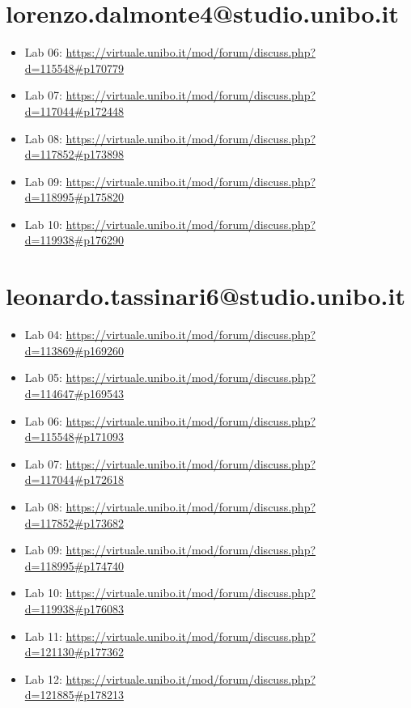 \documentclass[a4paper,12pt]{report}
\begin{document}
\section*{lorenzo.dalmonte4@studio.unibo.it}

\begin{itemize}
	\item Lab 06: \url{https://virtuale.unibo.it/mod/forum/discuss.php?d=115548#p170779}
	\item Lab 07: \url{https://virtuale.unibo.it/mod/forum/discuss.php?d=117044#p172448}
	\item Lab 08: \url{https://virtuale.unibo.it/mod/forum/discuss.php?d=117852#p173898}
	\item Lab 09: \url{https://virtuale.unibo.it/mod/forum/discuss.php?d=118995#p175820}
	\item Lab 10: \url{https://virtuale.unibo.it/mod/forum/discuss.php?d=119938#p176290}
\end{itemize}
\section*{leonardo.tassinari6@studio.unibo.it}

\begin{itemize}
	\item Lab 04: \url{https://virtuale.unibo.it/mod/forum/discuss.php?d=113869#p169260}
	\item Lab 05: \url{https://virtuale.unibo.it/mod/forum/discuss.php?d=114647#p169543}
	\item Lab 06: \url{https://virtuale.unibo.it/mod/forum/discuss.php?d=115548#p171093}
	\item Lab 07: \url{https://virtuale.unibo.it/mod/forum/discuss.php?d=117044#p172618}
	\item Lab 08: \url{https://virtuale.unibo.it/mod/forum/discuss.php?d=117852#p173682}
	\item Lab 09: \url{https://virtuale.unibo.it/mod/forum/discuss.php?d=118995#p174740}
	\item Lab 10: \url{https://virtuale.unibo.it/mod/forum/discuss.php?d=119938#p176083}
	\item Lab 11: \url{https://virtuale.unibo.it/mod/forum/discuss.php?d=121130#p177362}
	\item Lab 12: \url{https://virtuale.unibo.it/mod/forum/discuss.php?d=121885#p178213}


\end{itemize}
\end{document}
